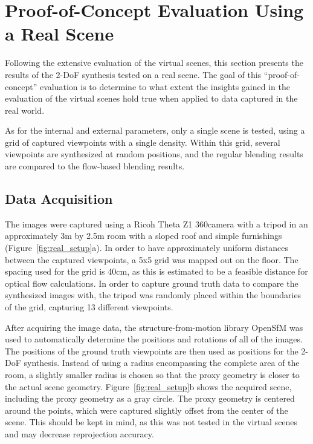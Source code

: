 \section{Proof-of-Concept Evaluation Using a Real Scene} \label{sec:pof_eval}
Following the extensive evaluation of the virtual scenes, this section presents the results of the 2-DoF synthesis tested on a real scene. The goal of this ``proof-of-concept'' evaluation is to determine to what extent the insights gained in the evaluation of the virtual scenes hold true when applied to data captured in the real world.

As for the internal and external parameters, only a single scene is tested, using a grid of captured viewpoints with a single density. Within this grid, several viewpoints are synthesized at random positions, and the regular blending results are compared to the flow-based blending results.

\subsection{Data Acquisition}
The images were captured using a Ricoh Theta Z1 360\degree camera with a tripod in an approximately 3m by 2.5m room with a sloped roof and simple furnishings (Figure~\ref{fig:real_setup}a). In order to have approximately uniform distances between the captured viewpoints, a 5x5 grid was mapped out on the floor. The spacing used for the grid is 40cm, as this is estimated to be a feasible distance for optical flow calculations. In order to capture ground truth data to compare the synthesized images with, the tripod was randomly placed within the boundaries of the grid, capturing 13 different viewpoints.

After acquiring the image data, the structure-from-motion library OpenSfM \cite{opensfm} was used to automatically determine the positions and rotations of all of the images. The positions of the ground truth viewpoints are then used as positions for the 2-DoF synthesis.
Instead of using a radius encompassing the complete area of the room, a slightly smaller radius is chosen so that the proxy geometry is closer to the actual scene geometry. Figure~\ref{fig:real_setup}b shows the acquired scene, including the proxy geometry as a gray circle. The proxy geometry is centered around the points, which were captured slightly offset from the center of the scene. This should be kept in mind, as this was not tested in the virtual scenes and may decrease reprojection accuracy.

